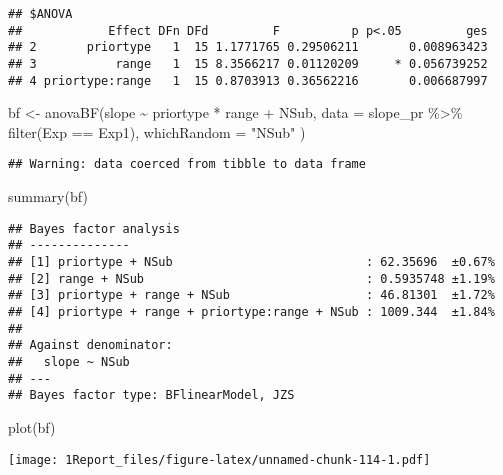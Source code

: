 \documentclass[
]{article}
\newenvironment{Shaded}{\begin{snugshade}}{\end{snugshade}}
\newcommand{\AttributeTok}[1]{\textcolor[rgb]{0.77,0.63,0.00}{#1}}
\newcommand{\FunctionTok}[1]{\textcolor[rgb]{0.00,0.00,0.00}{#1}}
\newcommand{\NormalTok}[1]{#1}
\newcommand{\OtherTok}[1]{\textcolor[rgb]{0.56,0.35,0.01}{#1}}
\newcommand{\SpecialCharTok}[1]{\textcolor[rgb]{0.00,0.00,0.00}{#1}}
\newcommand{\StringTok}[1]{\textcolor[rgb]{0.31,0.60,0.02}{#1}}
\begin{document}
\begin{verbatim}
## $ANOVA
##            Effect DFn DFd         F          p p<.05         ges
## 2       priortype   1  15 1.1771765 0.29506211       0.008963423
## 3           range   1  15 8.3566217 0.01120209     * 0.056739252
## 4 priortype:range   1  15 0.8703913 0.36562216       0.006687997
\end{verbatim}

\begin{Shaded}
\begin{Highlighting}[]
\NormalTok{bf }\OtherTok{\textless{}{-}} \FunctionTok{anovaBF}\NormalTok{(slope }\SpecialCharTok{\textasciitilde{}}\NormalTok{ priortype }\SpecialCharTok{*}\NormalTok{ range }\SpecialCharTok{+}\NormalTok{ NSub, }\AttributeTok{data =}\NormalTok{ slope\_pr }\SpecialCharTok{\%\textgreater{}\%} \FunctionTok{filter}\NormalTok{(Exp }\SpecialCharTok{==} \StringTok{\textquotesingle{}Exp1\textquotesingle{}}\NormalTok{), }\AttributeTok{whichRandom =} \StringTok{"NSub"}\NormalTok{ )}
\end{Highlighting}
\end{Shaded}

\begin{verbatim}
## Warning: data coerced from tibble to data frame
\end{verbatim}

\begin{Shaded}
\begin{Highlighting}[]
\FunctionTok{summary}\NormalTok{(bf)}
\end{Highlighting}
\end{Shaded}

\begin{verbatim}
## Bayes factor analysis
## --------------
## [1] priortype + NSub                           : 62.35696  ±0.67%
## [2] range + NSub                               : 0.5935748 ±1.19%
## [3] priortype + range + NSub                   : 46.81301  ±1.72%
## [4] priortype + range + priortype:range + NSub : 1009.344  ±1.84%
## 
## Against denominator:
##   slope ~ NSub 
## ---
## Bayes factor type: BFlinearModel, JZS
\end{verbatim}

\begin{Shaded}
\begin{Highlighting}[]
\FunctionTok{plot}\NormalTok{(bf)}
\end{Highlighting}
\end{Shaded}

\texttt{[image: 1Report\_files/figure-latex/unnamed-chunk-114-1.pdf]}
\end{document}
